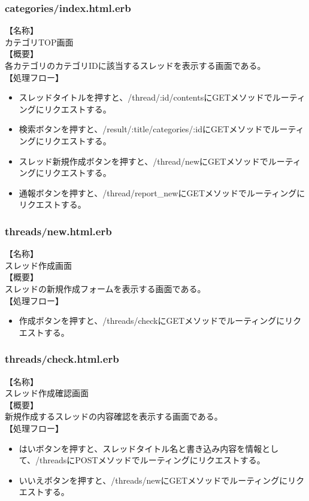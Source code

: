 \documentclass[a4j]{jarticle}
\begin{document}
\subsubsection{categories/index.html.erb}
\noindent
【名称】\\
カテゴリTOP画面\\
【概要】\\
各カテゴリのカテゴリIDに該当するスレッドを表示する画面である。\\
【処理フロー】
\begin{itemize}
  \item スレッドタイトルを押すと、/thread/:id/contentsにGETメソッドでルーティングにリクエストする。
  \item 検索ボタンを押すと、/result/:title/categories/:idにGETメソッドでルーティングにリクエストする。
  \item スレッド新規作成ボタンを押すと、/thread/newにGETメソッドでルーティングにリクエストする。
  \item 通報ボタンを押すと、/thread/report\_newにGETメソッドでルーティングにリクエストする。
\end{itemize}

\subsubsection{threads/new.html.erb}
\noindent
【名称】\\
スレッド作成画面\\
【概要】\\
スレッドの新規作成フォームを表示する画面である。\\
【処理フロー】
\begin{itemize}
  \item 作成ボタンを押すと、/threads/checkにGETメソッドでルーティングにリクエストする。
\end{itemize}

\subsubsection{threads/check.html.erb}
\noindent
【名称】\\
スレッド作成確認画面\\
【概要】\\
新規作成するスレッドの内容確認を表示する画面である。\\
【処理フロー】
\begin{itemize}
  \item はいボタンを押すと、スレッドタイトル名と書き込み内容を情報として、/threadsにPOSTメソッドでルーティングにリクエストする。
  \item いいえボタンを押すと、/threads/newにGETメソッドでルーティングにリクエストする。
\end{itemize}
\end{document}

